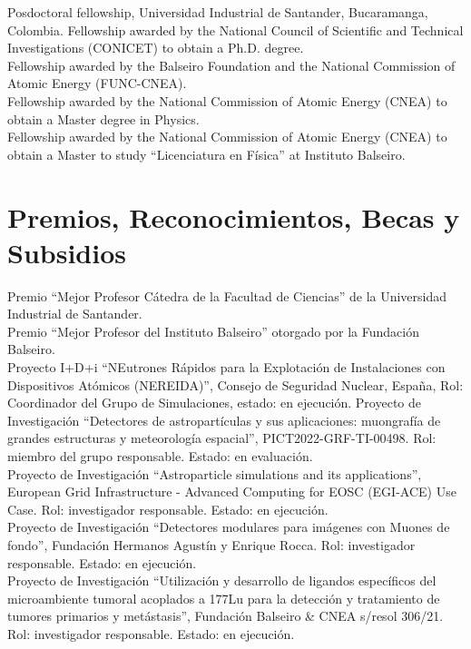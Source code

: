 Posdoctoral fellowship, Universidad Industrial de Santander, Bucaramanga, Colombia.
 Fellowship awarded by the National Council of Scientific and Technical Investigations (CONICET) to obtain a Ph.D. degree.\\
 Fellowship awarded by the Balseiro Foundation and the National Commission of Atomic Energy (FUNC-CNEA).\\
 Fellowship awarded by the National Commission of Atomic Energy (CNEA) to obtain a Master degree in Physics.\\
 Fellowship awarded by the National Commission of Atomic Energy (CNEA) to obtain a Master to study ``Licenciatura en Física'' at Instituto Balseiro.\\
\fi
\else
\section*{Premios, Reconocimientos, Becas y Subsidios}
\noindent
{} Premio ``Mejor Profesor Cátedra de la Facultad de Ciencias'' de la Universidad Industrial de Santander.\\
 Premio ``Mejor Profesor del Instituto Balseiro'' otorgado por la Fundación Balseiro.\\
 Proyecto I+D+i ``NEutrones Rápidos para la Explotación de Instalaciones con Dispositivos Atómicos (NEREIDA)'', Consejo de Seguridad Nuclear, España, Rol: Coordinador del Grupo de Simulaciones, estado: en ejecución.
 Proyecto de Investigación ``Detectores de astropartículas y sus aplicaciones: muongrafía de grandes estructuras y meteorología espacial'', PICT2022-GRF-TI-00498. Rol: miembro del grupo responsable. Estado: en evaluación.\\
 Proyecto de Investigación ``Astroparticle simulations and its applications'', European Grid Infrastructure - Advanced Computing for EOSC (EGI-ACE) Use Case. Rol: investigador responsable. Estado: en ejecución.\\
 Proyecto de Investigación ``Detectores modulares para imágenes con Muones de fondo'', Fundación Hermanos Agustín y Enrique Rocca. Rol: investigador responsable. Estado: en ejecución.\\
 Proyecto de Investigación ``Utilización y desarrollo de ligandos específicos del microambiente tumoral acoplados a 177Lu para la detección y tratamiento de tumores primarios y metástasis'', Fundación Balseiro \& CNEA s/resol 306/21. Rol: investigador responsable. Estado: en ejecución.\\
